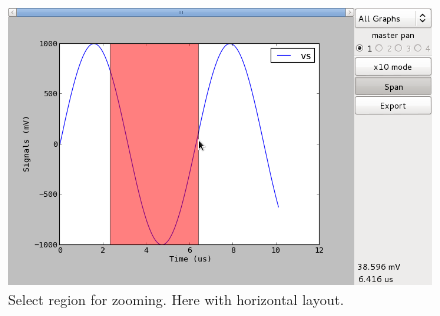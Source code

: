 \documentclass[a4paper,11pt]{report}
\begin{document}
\begin{figure}[htbp]
  \centering
  \includegraphics[scale=.5]{../png/ioscopy-span.png}
  \caption{Select region for zooming. Here with horizontal layout.}
  \label{fig:span}
\end{figure}

\appendix
\end{document}
